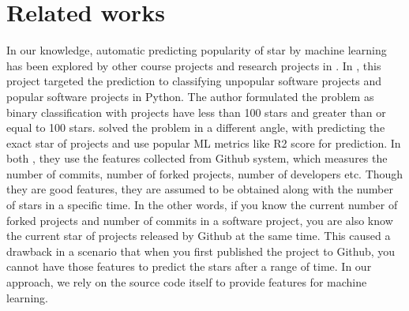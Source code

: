 \section{Related works}
In our knowledge, automatic predicting popularity of star by machine learning has been explored by other course projects and research projects in \cite{002,003,004}. In \cite{004}, this project targeted the prediction to classifying unpopular software projects and popular software projects in Python. The author formulated the problem as binary classification with projects have less than 100 stars and greater than or equal to 100 stars. \cite{002,003} solved the problem in a different angle, with predicting the exact star of projects and use popular ML metrics like R2 score for prediction. In both \cite{002,003,004}, they use the features collected from Github system, which measures the number of commits, number of forked projects, number of developers etc. Though they are good features, they are assumed to be obtained along with the number of stars in a specific time. In the other words, if you know the current number of forked projects and number of commits in a software project, you are also know the current star of projects released by Github at the same time. This caused a drawback in a scenario that when you first published the project to Github, you cannot have those features to predict the stars after a range of time. In our approach, we rely on the source code itself to provide features for machine learning.

